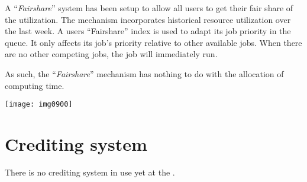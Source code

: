 A ``\emph{Fairshare}'' system has been setup to allow all users to get their
fair share of the \hpcname utilization.  The mechanism incorporates historical
resource utilization over the last week.  A users ``Fairshare'' index is used
to adapt its job priority in the queue.  It only affects its job's priority
relative to other available jobs. When there are no other competing jobs, the
job will immediately run.

As such, the ``\emph{Fairshare}'' mechanism has nothing to do with the
allocation of computing time.

\texttt{[image: img0900]}

\section{Crediting system}

There is no crediting system in use yet at the \hpc.
